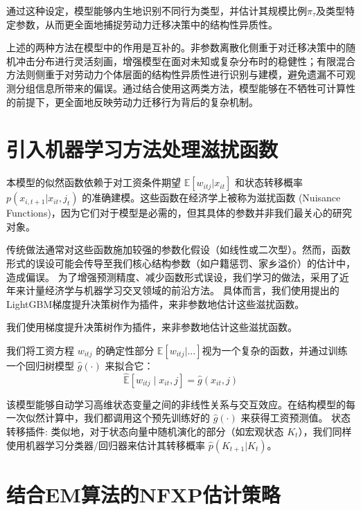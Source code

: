 \documentclass[master, final]{zufe-thesis}
\begin{document}
通过这种设定，模型能够内生地识别不同行为类型，并估计其规模比例$\pi_\tau$及类型特定参数，从而更全面地捕捉劳动力迁移决策中的结构性异质性。

上述的两种方法在模型中的作用是互补的。非参数离散化侧重于对迁移决策中的随机冲击分布进行灵活刻画，增强模型在面对未知或复杂分布时的稳健性；有限混合方法则侧重于对劳动力个体层面的结构性异质性进行识别与建模，避免遗漏不可观测分组信息所带来的偏误。通过结合使用这两类方法，模型能够在不牺牲可计算性的前提下，更全面地反映劳动力迁移行为背后的复杂机制。





\section{引入机器学习方法处理滋扰函数} 
\label{sec:ml_plugins}



本模型的似然函数依赖于对工资条件期望 $\mathbb{E}[w_{itj} | x_{it}]$ 和状态转移概率 $p(x_{i,t+1} | x_{it}, j_t)$ 的准确建模。这些函数在经济学上被称为滋扰函数 (Nuisance Functions)，因为它们对于模型是必需的，但其具体的参数并非我们最关心的研究对象。

传统做法通常对这些函数施加较强的参数化假设（如线性或二次型）。然而，函数形式的误设可能会传导至我们核心结构参数（如户籍惩罚、家乡溢价）的估计中，造成偏误。
为了增强预测精度、减少函数形式误设，我们学习\textcite{atheyGeneralizedRandomForests2019}的做法，采用了近年来计量经济学与机器学习交叉领域的前沿方法。
具体而言，我们使用\textcite{keLightGBMHighlyEfficient2017}提出的LightGBM梯度提升决策树作为插件，来非参数地估计这些滋扰函数。

我们使用梯度提升决策树作为插件，来非参数地估计这些滋扰函数。

我们将工资方程 $w_{itj}$ 的确定性部分 $\mathbb{E}[w_{itj} | ...] $视为一个复杂的函数，并通过训练一个回归树模型 $\hat{g}(\cdot)$ 来拟合它：
\begin{equation}
\hat{\mathbb{E}}[w_{itj} \mid x_{it}, j] = \hat{g}(x_{it}, j)
\end{equation}

该模型能够自动学习高维状态变量之间的非线性关系与交互效应。在结构模型的每一次似然计算中，我们都调用这个预先训练好的 $\hat{g}(\cdot)$ 来获得工资预测值。
状态转移插件: 类似地，对于状态向量中随机演化的部分（如宏观状态 $K_t$），我们同样使用机器学习分类器/回归器来估计其转移概率 $\hat{p}(K_{t+1} | K_t)$。




\section{结合EM算法的NFXP估计策略}
\end{document}
